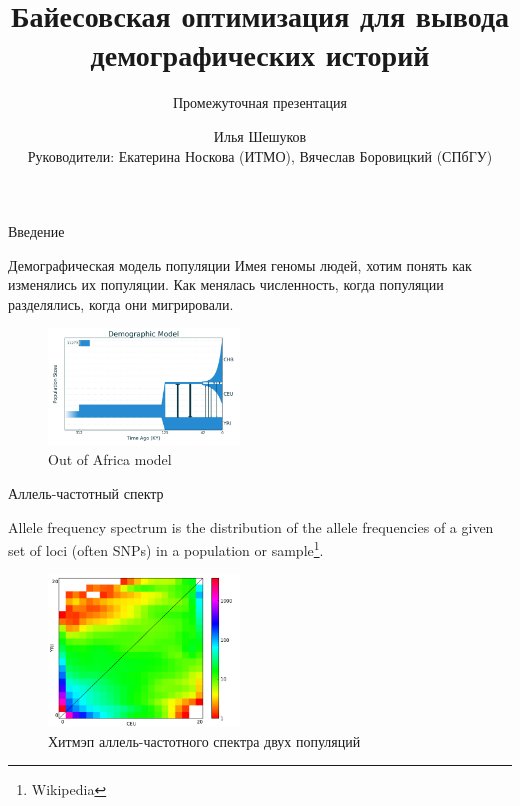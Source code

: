 \documentclass[presentation, smaller]{beamer}
\author{Илья Шешуков \\ Руководители: Екатерина Носкова (ИТМО), Вячеслав Боровицкий (СПбГУ)}
\date{}
\title{Байесовская оптимизация для вывода демографических историй}
\subtitle{Промежуточная презентация}
\begin{document}
\maketitle

\begin{frame}[label={sec:org775086f}]{Введение}
\begin{block}{Демографическая модель популяции}
Имея геномы людей, хотим понять как изменялись их популяции.
Как менялась численность, когда популяции разделялись, когда они мигрировали.

\begin{figure}[htbp]
\centering
\includegraphics[width=2in]{./pics/outofafrica.png}
\caption{\label{fig:org6e19d1c}
Out of Africa model}
\end{figure}
\end{block}
\end{frame}

\begin{frame}[label={sec:org877d9a8}]{Аллель-частотный спектр}
\begin{definition}
Allele frequency spectrum is the distribution of the allele frequencies of a
given set of loci (often SNPs) in a population or sample\footnote{Wikipedia}.

\begin{figure}[htbp]
\centering
\includegraphics[width=2in]{./pics/sfs.png}
\caption{\label{fig:orge7fa162}
Хитмэп аллель-частотного спектра двух популяций}
\end{figure}
\end{definition}
\end{frame}
\end{document}

